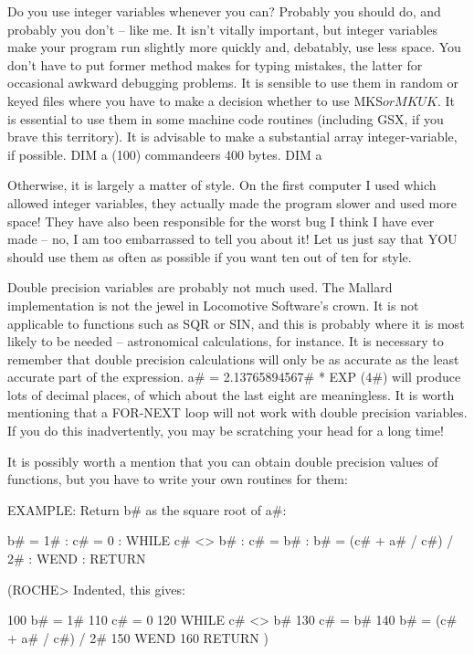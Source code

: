 Do  you  use integer variables whenever you can? Probably you should  do,  and 
probably  you  don't  --  like me. It isn't  vitally  important,  but  integer 
variables make your program run slightly more quickly and, debatably, use less 
space. You don't have to put %
former  method  makes for typing mistakes, the latter for  occasional  awkward 
debugging problems. It is sensible to use them in random or keyed files  where 
you  have to make a decision whether to use MKS$ or MKUK$. It is essential  to 
use  them  in  some machine code routines (including GSX, if  you  brave  this 
territory).  It is advisable to make a substantial array integer-variable,  if 
possible. DIM a (100) commandeers 400 bytes. DIM a%

Otherwise, it is largely a matter of style. On the first computer I used which 
allowed integer variables, they actually made the program slower and used more 
space!  They have also been responsible for the worst bug I think I have  ever 
made  -- no, I am too embarrassed to tell you about it! Let us just  say  that 
YOU should use them as often as possible if you want ten out of ten for style.

Double   precision  variables  are  probably  not  much  used.   The   Mallard 
implementation  is  not the jewel in Locomotive Software's crown.  It  is  not 
applicable  to functions such as SQR or SIN, and this is probably where it  is 
most  likely  to be needed -- astronomical calculations, for instance.  It  is 
necessary  to  remember  that double precision calculations will  only  be  as 
accurate  as the least accurate part of the expression. a# = 2.13765894567#  * 
EXP  (4#) will produce lots of decimal places, of which about the  last  eight 
are  meaningless.  It is worth mentioning that a FOR-NEXT loop will  not  work 
with  double  precision variables. If you do this inadvertently,  you  may  be 
scratching your head for a long time!

It is possibly worth a mention that you can obtain double precision values  of 
functions, but you have to write your own routines for them:

EXAMPLE: Return b# as the square root of a#:

        b# = 1# : c# = 0 : WHILE c# <> b# : c# = b# : b# = (c# + a# / c#) / 2# 
: WEND : RETURN

(ROCHE> Indented, this gives:

        100 b# = 1#
        110 c# = 0
        120 WHILE c# <> b#
        130       c# = b#
        140       b# = (c# + a# / c#) / 2#
        150 WEND
        160 RETURN
)


